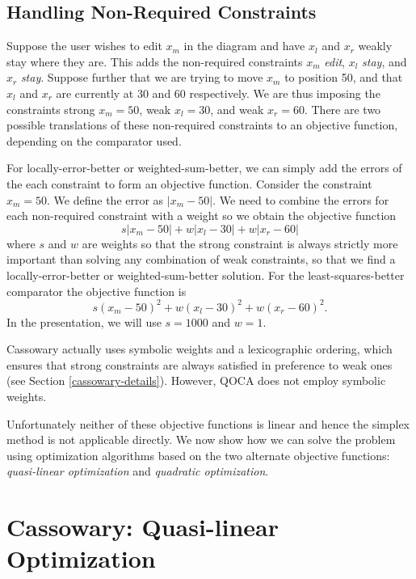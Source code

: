 \documentclass{article}
\newcommand{\strength}{\rm}
\begin{document}
\subsection{Handling Non-Required Constraints}
\label{non-requireds}

Suppose the user wishes to edit $x_m$ in the diagram and have $x_l$ and
$x_r$ weakly stay where they are.  This adds the non-required constraints
$x_m$ {\em edit}, $x_l$ {\em stay}, and $x_r$ {\em stay}.  Suppose further
that we are trying to move $x_m$ to position 50, and that $x_l$ and $x_r$ are
currently at 30 and 60 respectively.  We are thus imposing the constraints
{\strength strong} $x_m = 50$, {\strength weak} $x_l = 30$, and 
{\strength weak} $x_r = 60$.
There are two possible translations of these non-required constraints
to an objective function, depending on the comparator used.

For locally-error-better or weighted-sum-better, we can
simply add the errors of the each constraint to form an objective function.
Consider the constraint $x_m = 50$.  We define the error as $|x_m-50|$\@.  We
need to combine the errors for each non-required constraint with a weight
so we obtain the objective function 
$$s |x_m - 50| + w |x_l - 30| + w |x_r - 60|$$
where $s$ and $w$ are weights so that the strong constraint is always
strictly more important than solving any combination of weak constraints,
so that we find a locally-error-better or weighted-sum-better solution.
For the least-squares-better comparator the objective function is 
$$s (x_m - 50)^2 + w (x_l - 30)^2 + w (x_r - 60)^2.$$  
In the presentation, we will use $s = 1000$ and $w = 1$.

Cassowary actually uses symbolic weights and a lexicographic ordering,
which ensures that strong constraints are always satisfied in preference to
weak ones (see Section \ref{cassowary-details}).  However, QOCA 
does not employ symbolic weights.

Unfortunately neither of these objective functions is linear and hence the
simplex method is not applicable directly.  We now show how we can 
solve the problem using optimization algorithms
based on the two alternate objective functions: \emph{quasi-linear
optimization} and \emph{quadratic optimization}.

\section{Cassowary: Quasi-linear Optimization}
\label{quasi-linear}
\end{document}
